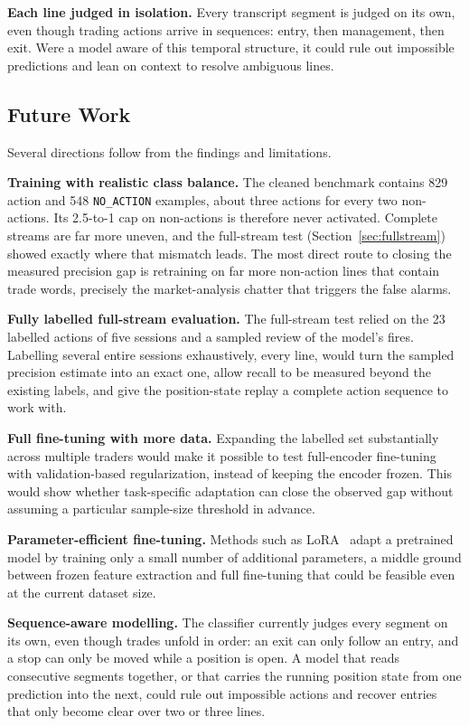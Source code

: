 \textbf{Each line judged in isolation.} Every transcript segment is judged on its own, even though trading actions arrive in sequences: entry, then management, then exit. Were a model aware of this temporal structure, it could rule out impossible predictions and lean on context to resolve ambiguous lines.

\subsection{Future Work}
\label{sec:future_work}

Several directions follow from the findings and limitations.

\textbf{Training with realistic class balance.} The cleaned benchmark contains 829 action and 548 \texttt{NO\_ACTION} examples, about three actions for every two non-actions. Its 2.5-to-1 cap on non-actions is therefore never activated. Complete streams are far more uneven, and the full-stream test (Section~\ref{sec:fullstream}) showed exactly where that mismatch leads. The most direct route to closing the measured precision gap is retraining on far more non-action lines that contain trade words, precisely the market-analysis chatter that triggers the false alarms.

\textbf{Fully labelled full-stream evaluation.} The full-stream test relied on the 23 labelled actions of five sessions and a sampled review of the model's fires. Labelling several entire sessions exhaustively, every line, would turn the sampled precision estimate into an exact one, allow recall to be measured beyond the existing labels, and give the position-state replay a complete action sequence to work with.

\textbf{Full fine-tuning with more data.} Expanding the labelled set substantially across multiple traders would make it possible to test full-encoder fine-tuning with validation-based regularization, instead of keeping the encoder frozen. This would show whether task-specific adaptation can close the observed gap without assuming a particular sample-size threshold in advance.

\textbf{Parameter-efficient fine-tuning.} Methods such as LoRA~\cite{hu2021lora} adapt a pretrained model by training only a small number of additional parameters, a middle ground between frozen feature extraction and full fine-tuning that could be feasible even at the current dataset size.

\textbf{Sequence-aware modelling.} The classifier currently judges every segment on its own, even though trades unfold in order: an exit can only follow an entry, and a stop can only be moved while a position is open. A model that reads consecutive segments together, or that carries the running position state from one prediction into the next, could rule out impossible actions and recover entries that only become clear over two or three lines.

